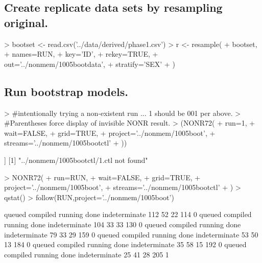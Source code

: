 \subsection{Create replicate data sets by resampling original.}
\begin{Schunk}
\begin{Sinput}
>  bootset <- read.csv('../data/derived/phase1.csv')
>  r <- resample(
+  	bootset,
+  	names=RUN,
+  	key='ID',
+  	rekey=TRUE,
+  	out='../nonmem/1005bootdata',
+  	stratify='SEX'
+  )
\end{Sinput}
\end{Schunk}
\subsection{Run bootstrap models.}
\begin{Schunk}
\begin{Sinput}
> #intentionally trying a non-existent run ... 1 should be 001 per above. 
> #Parentheses force display of invisible NONR result.
> (NONR72(
+      run=1,
+      wait=FALSE,
+      grid=TRUE,
+      project='../nonmem/1005boot',
+      streams='../nonmem/1005bootctl'
+ ))
\end{Sinput}
\begin{Soutput}
[[1]]
[1] "../nonmem/1005bootctl/1.ctl not found"
\end{Soutput}
\begin{Sinput}
> NONR72(
+      run=RUN,
+      wait=FALSE,
+      grid=TRUE,
+      project='../nonmem/1005boot',
+      streams='../nonmem/1005bootctl'
+ )
> qstat()
> follow(RUN,project='../nonmem/1005boot')
\end{Sinput}
\begin{Soutput}
       queued      compiled       running          done indeterminate 
          112            52            22           114             0 
       queued      compiled       running          done indeterminate 
          104            33            33           130             0 
       queued      compiled       running          done indeterminate 
           79            33            29           159             0 
       queued      compiled       running          done indeterminate 
           53            50            13           184             0 
       queued      compiled       running          done indeterminate 
           35            58            15           192             0 
       queued      compiled       running          done indeterminate 
           25            41            28           205             1 

\end{Soutput}
\end{Schunk}
